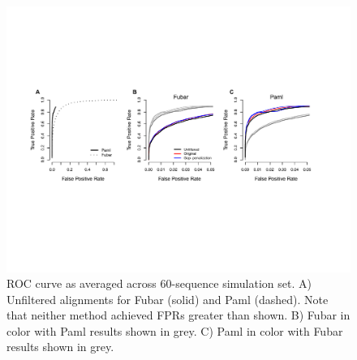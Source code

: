 \documentclass[10pt]{article}
\begin{document}
\begin{figure}[H]
\centerline{\includegraphics[width=7in]{Figures/roc.pdf}}
\caption{\label{roc} ROC curve as averaged across 60-sequence simulation set. A) Unfiltered alignments for Fubar (solid) and Paml (dashed). Note that neither method achieved FPRs greater than shown. B) Fubar in color with Paml results shown in grey. C) Paml in color with Fubar results shown in grey.}
\end{figure}
\end{document}
